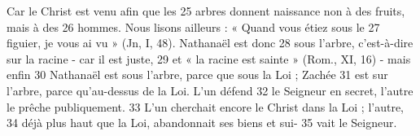 Car le Christ est venu afin que les	 
25	 	arbres donnent naissance non à des fruits, mais à des	 
26	 	hommes. Nous lisons ailleurs : « Quand vous étiez sous le	 
27	 	figuier, je vous ai vu » (Jn, I, 48). Nathanaël est donc	 
28	 	sous l'arbre, c'est-à-dire sur la racine - car il est juste,	 
29	 	et « la racine est sainte » (Rom., XI, 16) - mais enfin	 
30	 	Nathanaël est sous l'arbre, parce que sous la Loi ; Zachée	 
31	 	est sur l'arbre, parce qu'au-dessus de la Loi. L'un défend	 
32	 	le Seigneur en secret, l'autre le prêche publiquement.	 
33	 	L'un cherchait encore le Christ dans la Loi ; l'autre,	 
34	 	déjà plus haut que la Loi, abandonnait ses biens et sui-	 
35	 	vait le Seigneur.